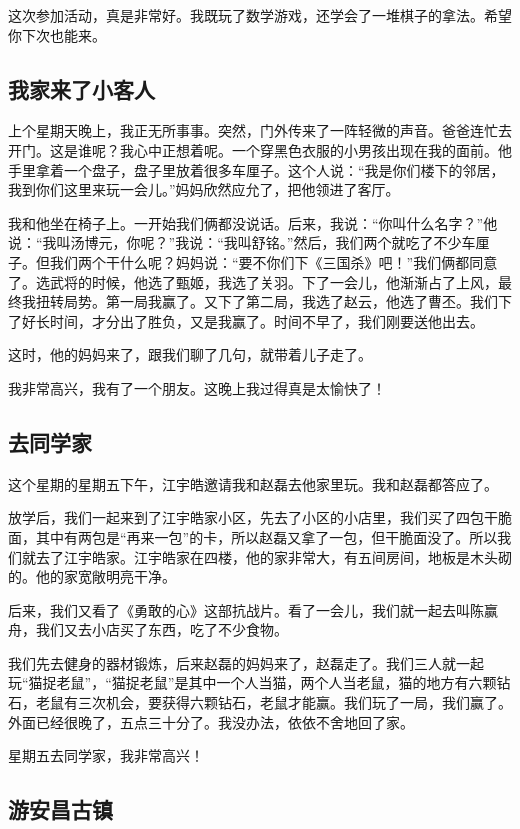 \documentclass[UTF8,a4paper,titlepage,twoside,10.5pt]{article}
\begin{document}
这次参加活动，真是非常好。我既玩了数学游戏，还学会了一堆棋子的拿法。希望你下次也能来。

\subsection{我家来了小客人}
\label{sec:org4e1869d}

上个星期天晚上，我正无所事事。突然，门外传来了一阵轻微的声音。爸爸连忙去开门。这是谁呢？我心中正想着呢。一个穿黑色衣服的小男孩出现在我的面前。他手里拿着一个盘子，盘子里放着很多车厘子。这个人说：“我是你们楼下的邻居，我到你们这里来玩一会儿。”妈妈欣然应允了，把他领进了客厅。

我和他坐在椅子上。一开始我们俩都没说话。后来，我说：“你叫什么名字？”他说：“我叫汤博元，你呢？”我说：“我叫舒铭。”然后，我们两个就吃了不少车厘子。但我们两个干什么呢？妈妈说：“要不你们下《三国杀》吧！”我们俩都同意了。选武将的时候，他选了甄姬，我选了关羽。下了一会儿，他渐渐占了上风，最终我扭转局势。第一局我赢了。又下了第二局，我选了赵云，他选了曹丕。我们下了好长时间，才分出了胜负，又是我赢了。时间不早了，我们刚要送他出去。

这时，他的妈妈来了，跟我们聊了几句，就带着儿子走了。

我非常高兴，我有了一个朋友。这晚上我过得真是太愉快了！

\subsection{去同学家}
\label{sec:org797cbe2}

这个星期的星期五下午，江宇皓邀请我和赵磊去他家里玩。我和赵磊都答应了。

放学后，我们一起来到了江宇皓家小区，先去了小区的小店里，我们买了四包干脆面，其中有两包是“再来一包”的卡，所以赵磊又拿了一包，但干脆面没了。所以我们就去了江宇皓家。江宇皓家在四楼，他的家非常大，有五间房间，地板是木头砌的。他的家宽敞明亮干净。

后来，我们又看了《勇敢的心》这部抗战片。看了一会儿，我们就一起去叫陈赢舟，我们又去小店买了东西，吃了不少食物。

我们先去健身的器材锻炼，后来赵磊的妈妈来了，赵磊走了。我们三人就一起玩“猫捉老鼠”，“猫捉老鼠”是其中一个人当猫，两个人当老鼠，猫的地方有六颗钻石，老鼠有三次机会，要获得六颗钻石，老鼠才能赢。我们玩了一局，我们赢了。外面已经很晚了，五点三十分了。我没办法，依依不舍地回了家。

星期五去同学家，我非常高兴！

\subsection{游安昌古镇}
\label{sec:orgb71dbdb}
\end{document}
